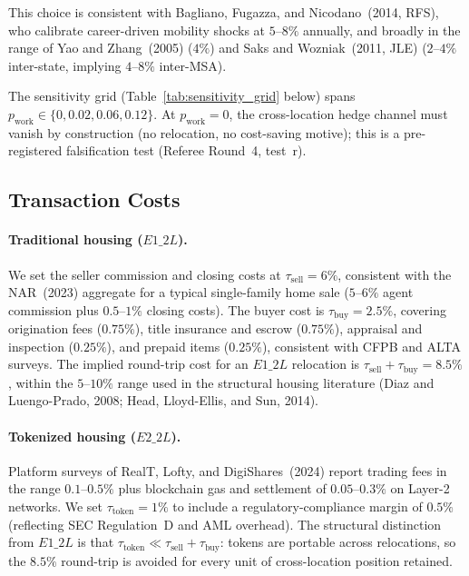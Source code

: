 This choice is consistent with Bagliano, Fugazza, and Nicodano~(2014, RFS),
who calibrate career-driven mobility shocks at $5$--$8\%$ annually, and
broadly in the range of Yao and Zhang~(2005) ($4\%$) and Saks and
Wozniak~(2011, JLE) ($2$--$4\%$ inter-state, implying $4$--$8\%$ inter-MSA).

The sensitivity grid (Table~\ref{tab:sensitivity_grid} below)
spans $p_{\text{work}} \in \{0, 0.02, 0.06, 0.12\}$.
At $p_{\text{work}} = 0$, the cross-location hedge channel must vanish by
construction (no relocation, no cost-saving motive); this is a pre-registered
falsification test (Referee Round~4, test~r).

\subsection{Transaction Costs}
\label{sec:calibration:txcost}

\paragraph{Traditional housing ($E1\_2L$).}
We set the seller commission and closing costs at $\tau_{\text{sell}} = 6\%$,
consistent with the NAR~(2023) aggregate for a typical single-family
home sale ($5$--$6\%$ agent commission plus $0.5$--$1\%$ closing costs).
The buyer cost is $\tau_{\text{buy}} = 2.5\%$,
covering origination fees ($0.75\%$), title insurance and escrow
($0.75\%$), appraisal and inspection ($0.25\%$), and prepaid items
($0.25\%$), consistent with CFPB and ALTA surveys.
The implied round-trip cost for an $E1\_2L$ relocation is
$\tau_{\text{sell}} + \tau_{\text{buy}} = 8.5\%$,
within the $5$--$10\%$ range used in the structural housing literature
(Diaz and Luengo-Prado, 2008; Head, Lloyd-Ellis, and Sun, 2014).

\paragraph{Tokenized housing ($E2\_2L$).}
Platform surveys of RealT, Lofty, and DigiShares~(2024) report trading
fees in the range $0.1$--$0.5\%$ plus blockchain gas and settlement
of $0.05$--$0.3\%$ on Layer-2 networks.
We set $\tau_{\text{token}} = 1\%$ to include a regulatory-compliance
margin of $0.5\%$ (reflecting SEC Regulation~D and AML overhead).
The structural distinction from $E1\_2L$ is that $\tau_{\text{token}} \ll \tau_{\text{sell}} + \tau_{\text{buy}}$:
tokens are portable across relocations, so the $8.5\%$ round-trip is avoided
for every unit of cross-location position retained.

